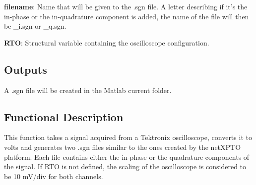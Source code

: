 \textbf{filename}: Name that will be given to the .sgn file. A letter describing if it's the in-phase or the in-quadrature component is added, the name of the file will then be \_i.sgn or \_q.sgn.
\bigskip

\textbf{RTO}: Structural variable containing the oscilloscope configuration.


\subsection*{Outputs}
A .sgn file will be created in the Matlab current folder.


\subsection*{Functional Description}

This function takes a signal acquired from a Tektronix oscilloscope, converts it to volts and generates two .sgn files similar to the ones created by the netXPTO platform. Each file contains either the in-phase or the quadrature components of the signal. If RTO is not defined, the scaling of the oscilloscope is considered to be 10 mV/div for both channels.